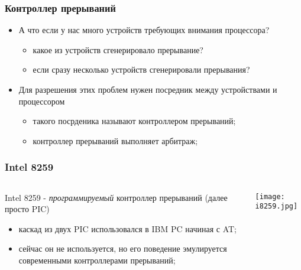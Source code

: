 \begin{frame}
\frametitle{Контроллер прерываний}
\begin{itemize}
  \item А что если у нас много устройств требующих внимания процессора?
  \begin{itemize}
    \item какое из устройств сгенерировало прерывание?
    \item если сразу несколько устройств сгенерировали прерывания?
  \end{itemize}
  \item Для разрешения этих проблем нужен посредник между устройствами и
  процессором
  \begin{itemize}
    \item такого посрденика называют контроллером прерываний;
    \item контроллер прерываний выполняет арбитраж;
  \end{itemize}
\end{itemize}
\end{frame}

\begin{frame}
\frametitle{Intel 8259}
\begin{columns}
  \begin{column}{0.7\textwidth}
  Intel 8259 - \emph{программируемый} контроллер прерываний (далее просто PIC)
  \begin{itemize}
    \item каскад из двух PIC использовался в IBM PC начиная с AT;
    \item сейчас он не используется, но его поведение эмулируется современными
    контроллерами прерываний;
  \end{itemize}
  \end{column}
  \begin{column}{0.3\textwidth}
    \begin{center}
      \texttt{[image: i8259.jpg]}
    \end{center}
  \end{column}
\end{columns}
\end{frame}


